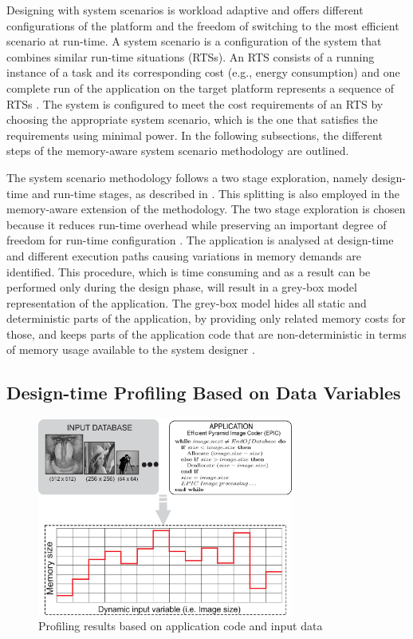 \documentclass[smallcondensed]{svjour3}
\begin{document}
Designing with system scenarios is workload adaptive and offers different configurations of the platform and the freedom of switching to the most efficient scenario at run-time. 
A system scenario is a configuration of the system that combines similar run-time situations (RTSs). 
An RTS consists of a running instance of a task and its corresponding cost (e.g., energy consumption) and one complete run of the application on the target platform represents a sequence of RTSs \cite{Elena2010}. 
The system is configured to meet the cost requirements of an RTS by choosing the appropriate system scenario, which is the one that satisfies the requirements using minimal power. 
In the following subsections, the different steps of the memory-aware system scenario methodology are outlined. 

The system scenario methodology follows a two stage exploration, namely design-time and run-time stages, as described in \cite{Gheorghita2007}. 
This splitting is also employed in the memory-aware extension of the methodology. 
The two stage exploration is chosen because it reduces run-time overhead while preserving an important degree of freedom for run-time configuration \cite{tcm}. 
The application is analysed at design-time and different execution paths causing variations in memory demands are identified. 
This procedure, which is time consuming and as a result can be performed only during the design phase, will result in a grey-box model representation of the application. 
The grey-box model hides all static and deterministic parts of the application, by providing only related memory costs for those, and keeps parts of the application code that are non-deterministic in terms of memory usage available to the system designer \cite{graybox}. 


\subsection{Design-time Profiling Based on Data Variables}

\begin{figure}
\centering
\includegraphics[width=0.75\textwidth]{Images/profiling2.eps}
\caption{Profiling results based on application code and input data}
\label{fig:profiling}
\end{figure}
\end{document}
